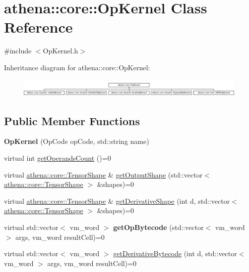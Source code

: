 \hypertarget{classathena_1_1core_1_1_op_kernel}{}\section{athena\+:\+:core\+:\+:Op\+Kernel Class Reference}
\label{classathena_1_1core_1_1_op_kernel}


{\ttfamily \#include $<$Op\+Kernel.\+h$>$}

Inheritance diagram for athena\+:\+:core\+:\+:Op\+Kernel\+:\begin{figure}[H]
\begin{center}
\leavevmode
\includegraphics[height=0.929461cm]{classathena_1_1core_1_1_op_kernel}
\end{center}
\end{figure}
\subsection*{Public Member Functions}
\begin{DoxyCompactItemize}
\item 
\mbox{\label{classathena_1_1core_1_1_op_kernel_a1adf0c5c97ce4d3e9c0155ea4bf48ab5}} 
{\bfseries Op\+Kernel} (Op\+Code op\+Code, std\+::string name)
\item 
virtual int \mbox{\hyperlink{classathena_1_1core_1_1_op_kernel_add97d4c132d80ecd9915acfedf7c9119}{get\+Operands\+Count}} ()=0
\item 
virtual \mbox{\hyperlink{classathena_1_1core_1_1_tensor_shape}{athena\+::core\+::\+Tensor\+Shape}} \& \mbox{\hyperlink{classathena_1_1core_1_1_op_kernel_a762e541463ffd089b47a8e6755c30fe1}{get\+Output\+Shape}} (std\+::vector$<$ \mbox{\hyperlink{classathena_1_1core_1_1_tensor_shape}{athena\+::core\+::\+Tensor\+Shape}} $>$ \&shapes)=0
\item 
virtual \mbox{\hyperlink{classathena_1_1core_1_1_tensor_shape}{athena\+::core\+::\+Tensor\+Shape}} \& \mbox{\hyperlink{classathena_1_1core_1_1_op_kernel_ad95af6dd184ce7ee9182ec7ca54b6c4d}{get\+Derivative\+Shape}} (int d, std\+::vector$<$ \mbox{\hyperlink{classathena_1_1core_1_1_tensor_shape}{athena\+::core\+::\+Tensor\+Shape}} $>$ \&shapes)=0
\item 
\mbox{\label{classathena_1_1core_1_1_op_kernel_a181a03e0a038151fda074a8c950f3003}} 
virtual std\+::vector$<$ vm\+\_\+word $>$ {\bfseries get\+Op\+Bytecode} (std\+::vector$<$ vm\+\_\+word $>$ args, vm\+\_\+word result\+Cell)=0
\item 
virtual std\+::vector$<$ vm\+\_\+word $>$ \mbox{\hyperlink{classathena_1_1core_1_1_op_kernel_ad500db1afc5a7c10acff8ecb8f1bee4d}{get\+Derivative\+Bytecode}} (int d, std\+::vector$<$ vm\+\_\+word $>$ args, vm\+\_\+word result\+Cell)=0
\end{DoxyCompactItemize}
